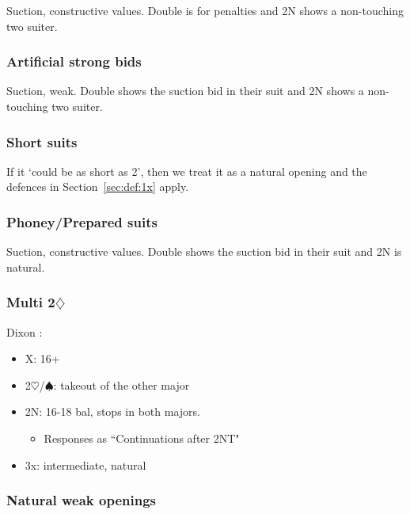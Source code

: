 \documentclass[a4paper,14pt]{extarticle}
\begin{document}
Suction, constructive values. Double is for penalties and 2N shows a
non-touching two suiter. 

\subsubsection{Artificial strong bids}
\label{sec:def:strong}

Suction, weak. Double shows the suction bid in their suit and 2N shows a
non-touching two suiter. 

\subsubsection{Short suits}
\label{sec:def:short}

If it `could be as short as 2', then we treat it as a natural opening and the
defences in Section~\ref{sec:def:1x} apply.

\subsubsection{Phoney/Prepared suits}
\label{sec:def:phoney}

Suction, constructive values. Double shows the suction bid in their suit and 2N
is natural. 

\newpage 

\subsubsection{Multi 2$\diamondsuit$}
\label{sec:def:multi}

Dixon :

\begin{itemize}
\item X: 16+
\item 2$\heartsuit$/$\spadesuit$: takeout of the other major
\item 2N: 16-18 bal, stops in both majors.
	\begin{itemize}
	\item Responses as ``Continuations after 2NT" 
	\end{itemize}
\item 3x: intermediate, natural
\end{itemize}

\subsubsection{Natural weak openings}
\label{sec:def:weak}
\end{document}
